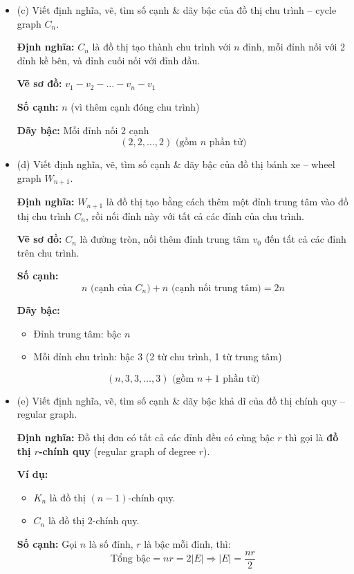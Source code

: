 \documentclass{article}
\begin{document}
\begin{itemize}
	 \item (c) Viết định nghĩa, vẽ, tìm số cạnh \& dãy bậc của đồ thị chu trình -- cycle graph $C_n$. 
	 
	 \textbf{Định nghĩa:} $C_n$ là đồ thị tạo thành chu trình với $n$ đỉnh, mỗi đỉnh nối với 2 đỉnh kề bên, và đỉnh cuối nối với đỉnh đầu.
	 
	 \textbf{Vẽ sơ đồ:} $v_1 - v_2 - \ldots - v_n - v_1$
	 
	 \textbf{Số cạnh:} $n$ (vì thêm cạnh đóng chu trình)
	 
	 \textbf{Dãy bậc:} Mỗi đỉnh nối 2 cạnh
	 \[
	 (2, 2, \ldots, 2) \text{ (gồm $n$ phần tử)}
	 \]
	 
	 \item (d) Viết định nghĩa, vẽ, tìm số cạnh \& dãy bậc của đồ thị bánh xe -- wheel graph $W_{n+1}$. 
	 
	 \textbf{Định nghĩa:} $W_{n+1}$ là đồ thị tạo bằng cách thêm một đỉnh trung tâm vào đồ thị chu trình $C_n$, rồi nối đỉnh này với tất cả các đỉnh của chu trình.
	 
	 \textbf{Vẽ sơ đồ:} $C_n$ là đường tròn, nối thêm đỉnh trung tâm $v_0$ đến tất cả các đỉnh trên chu trình.
	 
	 \textbf{Số cạnh:} 
	 \[
	 n \text{ (cạnh của } C_n) + n \text{ (cạnh nối trung tâm)} = 2n
	 \]
	 
	 \textbf{Dãy bậc:}
	 \begin{itemize}
	 	\item Đỉnh trung tâm: bậc $n$
	 	\item Mỗi đỉnh chu trình: bậc $3$ (2 từ chu trình, 1 từ trung tâm)
	 \end{itemize}
	 \[
	 (n, 3, 3, \ldots, 3) \text{ (gồm $n+1$ phần tử)}
	 \]
	 
	 \item (e) Viết định nghĩa, vẽ, tìm số cạnh \& dãy bậc khả dĩ của đồ thị chính quy -- regular graph. 
	 
	 \textbf{Định nghĩa:} Đồ thị đơn có tất cả các đỉnh đều có cùng bậc $r$ thì gọi là \textbf{đồ thị $r$-chính quy} (regular graph of degree $r$).
	 
	 \textbf{Ví dụ:} 
	 \begin{itemize}
	 	\item $K_n$ là đồ thị $(n-1)$-chính quy.
	 	\item $C_n$ là đồ thị 2-chính quy.
	 \end{itemize}
	 
	 \textbf{Số cạnh:} Gọi $n$ là số đỉnh, $r$ là bậc mỗi đỉnh, thì:
	 \[
	 \text{Tổng bậc} = nr = 2|E| \Rightarrow |E| = \frac{nr}{2}
	 \]
	 

\end{itemize}
\end{document}
